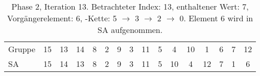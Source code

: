 \begin{table}[H]
\begin{adjustbox}{max width=\textwidth}
\begin{tabular}{lccccccccccccccc}
\multicolumn{1}{l|}{Gruppe}  & \multicolumn{1}{c|}{15} & 13 & \multicolumn{1}{c|}{14} & \multicolumn{1}{c|}{8}     & \multicolumn{1}{c|}{2}      & \multicolumn{1}{c|}{9}    & \multicolumn{1}{c|}{3}     & \multicolumn{1}{c|}{11} & \multicolumn{1}{c|}{5}   & 4  & \multicolumn{1}{c|}{10} & 1  & 6                         & 7  & 12                        \\
\multicolumn{1}{l|}{SA}      & \multicolumn{1}{c|}{15} & 14 & \multicolumn{1}{c|}{13} & \multicolumn{1}{c|}{8}     & \multicolumn{1}{c|}{2}      & \multicolumn{1}{c|}{9}    & \multicolumn{1}{c|}{3}     & \multicolumn{1}{c|}{11} & \multicolumn{1}{c|}{5}   & 10 & \multicolumn{1}{c|}{4}  & 12 & \cellcolor[HTML]{\green}7 & 1  & \cellcolor[HTML]{\red}6
\end{tabular}
\end{adjustbox}

\caption[Phase 2, Iteration 13]{Phase 2, Iteration 13. Betrachteter Index: 13, enthaltener Wert: 7, Vorgängerelement: 6, \prevpointer-Kette: 5 $\rightarrow$ 3 $\rightarrow$ 2 $\rightarrow$ 0. Element 6 wird in SA aufgenommen.}
\label{table_complex_example_2_13} 
\end{table}

